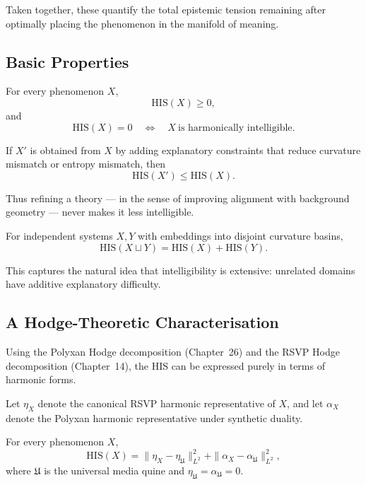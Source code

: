 Taken together, these quantify the total epistemic tension remaining after
optimally placing the phenomenon in the manifold of meaning.

\subsection*{Basic Properties}

\begin{proposition}
For every phenomenon $X$,
\[
\mathrm{HIS}(X)\ge 0,
\]
and
\[
\mathrm{HIS}(X)=0 \quad\Longleftrightarrow\quad X\ \text{is harmonically intelligible}.
\]
\end{proposition}

\begin{proposition}
If $X'$ is obtained from $X$ by adding explanatory constraints that reduce
curvature mismatch or entropy mismatch, then
\[
\mathrm{HIS}(X') \le \mathrm{HIS}(X).
\]
\end{proposition}

Thus refining a theory — in the sense of improving alignment with background
geometry — never makes it less intelligible.

\begin{proposition}
For independent systems $X,Y$ with embeddings into disjoint curvature basins,
\[
\mathrm{HIS}(X\sqcup Y)
  = \mathrm{HIS}(X) + \mathrm{HIS}(Y).
\]
\end{proposition}

This captures the natural idea that intelligibility is extensive: unrelated
domains have additive explanatory difficulty.

\subsection*{A Hodge-Theoretic Characterisation}

Using the Polyxan Hodge decomposition (Chapter~26) and the RSVP Hodge
decomposition (Chapter~14), the HIS can be expressed purely in terms of
harmonic forms.

Let $\eta_X$ denote the canonical RSVP harmonic representative of $X$, and
let $\alpha_X$ denote the Polyxan harmonic representative under synthetic
duality.

\begin{theorem}
\label{thm:HIS-hodge}
For every phenomenon $X$,
\begin{equation}
\mathrm{HIS}(X)
  = \|\eta_X - \eta_{\mathfrak{U}}\|_{L^2}^2
    + \|\alpha_X - \alpha_{\mathfrak{U}}\|_{L^2}^2,
\end{equation}
where $\mathfrak{U}$ is the universal media quine and
$\eta_{\mathfrak{U}}=\alpha_{\mathfrak{U}}=0$.
\end{theorem}

